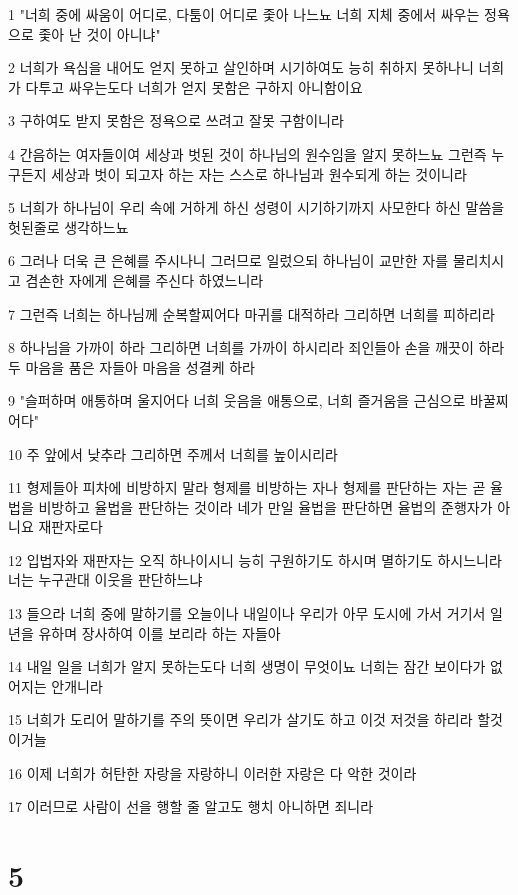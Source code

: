 \par 1 "너희 중에 싸움이 어디로, 다툼이 어디로 좇아 나느뇨 너희 지체 중에서 싸우는 정욕으로 좇아 난 것이 아니냐"
\par 2 너희가 욕심을 내어도 얻지 못하고 살인하며 시기하여도 능히 취하지 못하나니 너희가 다투고 싸우는도다 너희가 얻지 못함은 구하지 아니함이요
\par 3 구하여도 받지 못함은 정욕으로 쓰려고 잘못 구함이니라
\par 4 간음하는 여자들이여 세상과 벗된 것이 하나님의 원수임을 알지 못하느뇨 그런즉 누구든지 세상과 벗이 되고자 하는 자는 스스로 하나님과 원수되게 하는 것이니라
\par 5 너희가 하나님이 우리 속에 거하게 하신 성령이 시기하기까지 사모한다 하신 말씀을 헛된줄로 생각하느뇨
\par 6 그러나 더욱 큰 은혜를 주시나니 그러므로 일렀으되 하나님이 교만한 자를 물리치시고 겸손한 자에게 은혜를 주신다 하였느니라
\par 7 그런즉 너희는 하나님께 순복할찌어다 마귀를 대적하라 그리하면 너희를 피하리라
\par 8 하나님을 가까이 하라 그리하면 너희를 가까이 하시리라 죄인들아 손을 깨끗이 하라 두 마음을 품은 자들아 마음을 성결케 하라
\par 9 "슬퍼하며 애통하며 울지어다 너희 웃음을 애통으로, 너희 즐거움을 근심으로 바꿀찌어다"
\par 10 주 앞에서 낮추라 그리하면 주께서 너희를 높이시리라
\par 11 형제들아 피차에 비방하지 말라 형제를 비방하는 자나 형제를 판단하는 자는 곧 율법을 비방하고 율법을 판단하는 것이라 네가 만일 율법을 판단하면 율법의 준행자가 아니요 재판자로다
\par 12 입법자와 재판자는 오직 하나이시니 능히 구원하기도 하시며 멸하기도 하시느니라 너는 누구관대 이웃을 판단하느냐
\par 13 들으라 너희 중에 말하기를 오늘이나 내일이나 우리가 아무 도시에 가서 거기서 일년을 유하며 장사하여 이를 보리라 하는 자들아
\par 14 내일 일을 너희가 알지 못하는도다 너희 생명이 무엇이뇨 너희는 잠간 보이다가 없어지는 안개니라
\par 15 너희가 도리어 말하기를 주의 뜻이면 우리가 살기도 하고 이것 저것을 하리라 할것이거늘
\par 16 이제 너희가 허탄한 자랑을 자랑하니 이러한 자랑은 다 악한 것이라
\par 17 이러므로 사람이 선을 행할 줄 알고도 행치 아니하면 죄니라

\chapter{5}

